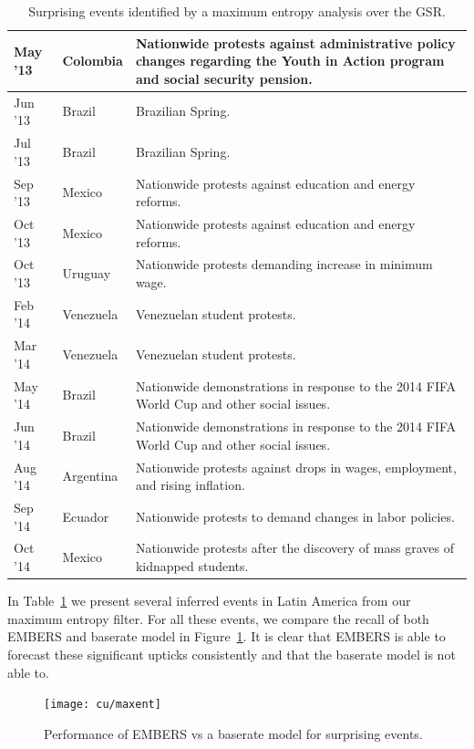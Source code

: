 \begin{table}
  \small
\caption{Surprising events identified by a maximum entropy analysis
over the GSR.}
\renewcommand{\arraystretch}{1.1}
 \centering
 \begin{tabular}{|l|l|m{5cm}|}
 \hline
May '13  &  Colombia	 &  Nationwide protests against administrative policy changes regarding the
Youth in Action program and social security pension. \\ \hline
Jun '13  &  Brazil  &  Brazilian Spring. \\ \hline
Jul '13  &  Brazil  &  Brazilian Spring. \\ \hline
Sep '13  &  Mexico  &  Nationwide protests against education and energy 
reforms. \\ \hline
Oct '13  &  Mexico  &  Nationwide protests against education and energy 
reforms. \\ \hline
Oct '13  &  Uruguay  &  Nationwide protests demanding increase in minimum 
wage. \\ \hline
Feb '14  &  Venezuela	  &  Venezuelan student protests. \\ \hline
Mar '14  &  Venezuela  &  	Venezuelan student protests. \\ \hline
May '14  &  Brazil  &  Nationwide demonstrations in response to the 
2014 FIFA World Cup and other social issues. \\ \hline
Jun '14  &  Brazil  &  Nationwide demonstrations in response to the 2014 FIFA World Cup and other social issues. \\ \hline
Aug '14  &  Argentina	  &  Nationwide protests against drops in wages, employment, and rising inflation. \\ \hline
Sep '14  &  Ecuador  &  Nationwide protests to demand changes in 
labor policies. \\ \hline
Oct '14  &  Mexico  &  Nationwide protests after the discovery of mass 
graves of kidnapped students. \\ \hline
\end{tabular}
\label{tab:maxentEvents}
\end{table}

In Table~\ref{tab:maxentEvents} we present several inferred events in Latin America from our maximum entropy
filter.
For all these events, we compare the recall of both EMBERS and baserate model
in Figure~\ref{fig:maxent}.
It is clear that EMBERS is able to forecast these significant upticks consistently and that the baserate model is not able to.

\begin{figure} %
\centering
\texttt{[image: cu/maxent]}
\caption{Performance of EMBERS vs a baserate model for surprising events.}
\label{fig:maxent}
\end{figure}
